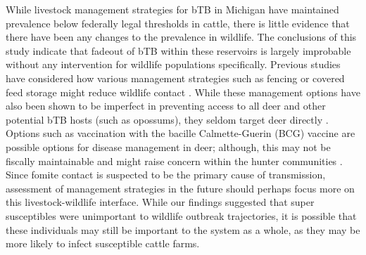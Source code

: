 \documentclass[number,preprint,review,12pt]{elsarticle}
\begin{document}
While livestock management strategies for bTB in Michigan have maintained prevalence below federally legal thresholds in cattle, there is little evidence that there have been any changes to the prevalence in wildlife. The conclusions of this study indicate that fadeout of bTB within these reservoirs is largely improbable without any intervention for wildlife populations specifically. Previous studies have considered how various management strategies such as fencing or covered feed storage might reduce wildlife contact \citep{Berentsen2014}. While these management options have also been shown to be imperfect in preventing access to all deer and other potential bTB hosts (such as opossums), they seldom target deer directly \citep{Wilber2019}. Options such as vaccination with the bacille Calmette-Guerin (BCG) vaccine are possible options for disease management in deer; although, this may not be fiscally maintainable and might raise concern within the hunter communities \citep{Palmer2007}. 
Since fomite contact is suspected to be the primary cause of transmission, assessment of management strategies in the future should perhaps focus more on this livestock-wildlife interface\citep{Lavelle2016}. While our findings suggested that super susceptibles were unimportant to wildlife outbreak trajectories, it is possible that these individuals may still be important to the system as a whole, as they may be more likely to infect susceptible cattle farms. 
\end{document}
